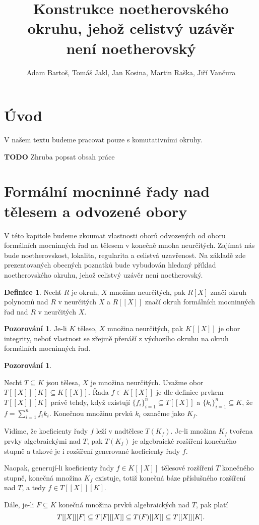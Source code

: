 \documentclass[11pt,a4paper]{article}
\title{Konstrukce noetherovského okruhu, jehož celistvý uzávěr\\ není noetherovský}
\author{Adam Bartoš, Tomáš Jakl, Jan Kosina, Martin Raška, Jiří Vančura}
\newcommand*{\todo}[1]{\textbf{TODO} #1}
\newcommand*{\ml}[1]{\[\textstyle\let\displaystyle\textstyle#1\]}	%
\newcounter{numb}
\theoremstyle{definition}
\newtheorem*{definice}{Definice}
\newtheorem{pozorovani}[numb]{Pozorování}
\theoremstyle{plain}
\begin{document}
\maketitle

\section{Úvod}
V našem textu budeme pracovat pouze s komutativními okruhy.

\todo{Zhruba popsat obsah práce}

\section{Formální mocninné řady nad tělesem a odvozené obory}

V této kapitole budeme zkoumat vlastnosti oborů odvozených od oboru formálních mocninných řad na tělesem v konečně mnoha neurčitých. Zajímat nás bude noetherovskost, lokalita, regularita a celistvá uzavřenost. Na základě zde prezentovaných obecných poznatků bude vybudován hledaný příklad noetherovského okruhu, jehož celistvý uzávěr není noetherovský.

\begin{definice}
	Nechť $R$ je okruh, $X$ množina neurčitých, pak $R[X]$ značí okruh polynomů nad $R$ v neurčitých $X$ a $R[[X]]$ značí okruh formálních mocninných řad nad $R$ v neurčitých $X$.
\end{definice}

\begin{pozorovani}
	Je-li $K$ těleso, $X$ množina neurčitých, pak $K[[X]]$ je obor integrity, neboť vlastnost  se zřejmě přenáší z výchozího okruhu na okruh formálních mocninných řad.
\end{pozorovani}

\begin{pozorovani} \label{thm:TXK}
	\newcommand*{\I}{_{i = 1}^n}

	Nechť $T \subseteq K$ jsou tělesa, $X$ je množina neurčitých. Uvažme obor $T[[X]][K] \subseteq K[[X]]$. Řada $f \in K[[X]]$ je dle definice prvkem $T[[X]][K]$ právě tehdy, když existují $\{f_i\}\I \subseteq T[[X]]$ a $\{k_i\}\I \subseteq K$, že $f = \sum\I f_i k_i$. Konečnou množinu prvků $k_i$ označme jako $K_f$.

	Vidíme, že koeficienty řady $f$ leží v nadtělese $T(K_f)$. Je-li množina $K_f$ tvořena prvky algebraickými nad $T$, pak $T(K_f)$ je algebraické rozšíření konečného stupně a takové je i rozšíření generované koeficienty řady $f$.

	Naopak, generují-li koeficienty řady $f \in K[[X]]$ tělesové rozšíření $T$ konečného stupně, konečná množina $K_f$ existuje, totiž konečná báze příslušného rozšíření nad $T$, a tedy $f \in T[[X]][K]$.

	Dále, je-li $F \subseteq K$ konečná množina prvků algebraických nad $T$, pak platí
	\ml{
		T[[X]][F] \subseteq T[F][[X]] \subseteq T(F)[[X]] \subseteq T[[X]][K].
	}
\end{pozorovani}
\end{document}
